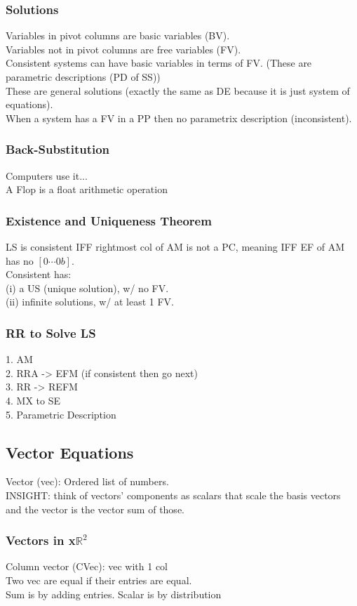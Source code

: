 \documentclass[12pt]{article}
\newcommand{\R}{\mathbb{R}}
\begin{document}
    \subsubsection{Solutions}
    Variables in pivot columns are basic variables (BV). \\
    Variables not in pivot columns are free variables (FV). \\
    Consistent systems can have basic variables in terms of FV.
    (These are parametric descriptions (PD of SS)) \\
    These are general solutions (exactly the same as DE because 
    it is just system of equations). \\
    When a system has a FV in a PP then no parametrix description (inconsistent).
    \subsubsection{Back-Substitution}
        Computers use it... \\
        A Flop is a float arithmetic operation
    \subsubsection{Existence and Uniqueness Theorem}
        LS is consistent IFF rightmost col of AM is not a PC,
        meaning IFF EF of AM has no $ [0 \cdots 0 b] $. \\
        Consistent has: \\
            (i) a US (unique solution), w/ no FV. \\
            (ii) infinite solutions, w/ at least 1 FV.
    \subsubsection{RR to Solve LS}
       1. AM \\
       2. RRA -> EFM (if consistent then go next) \\
       3. RR -> REFM \\
       4. MX to SE \\
       5. Parametric Description 
\subsection{Vector Equations}
    Vector (vec): Ordered list of numbers. \\
    INSIGHT: think of vectors' components as scalars that scale the
    basis vectors and the vector is the vector sum of those.
    \subsubsection{Vectors in x$ \R ^2  $ }
        Column vector (CVec): vec with 1 col \\
        Two vec are equal if their entries are equal. \\
        Sum is by adding entries. Scalar is by distribution 
\end{document}

